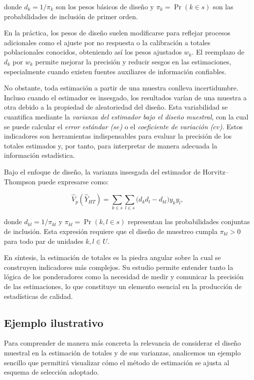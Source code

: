 \documentclass[
  spanish,
  12pt,
]{book}
\begin{document}
donde \(d_k = 1/\pi_k\) son los pesos básicos de diseño y \(\pi_k = \Pr(k \in s)\) son las probabilidades de inclusión de primer orden.

En la práctica, los pesos de diseño suelen modificarse para reflejar procesos adicionales como el ajuste por no respuesta o la calibración a totales poblacionales conocidos, obteniendo así los pesos ajustados \(w_k\). El reemplazo de \(d_k\) por \(w_k\) permite mejorar la precisión y reducir sesgos en las estimaciones, especialmente cuando existen fuentes auxiliares de información confiables.

No obstante, toda estimación a partir de una muestra conlleva incertidumbre. Incluso cuando el estimador es insesgado, los resultados varían de una muestra a otra debido a la propiedad de aleatoriedad del diseño. Esta variabilidad se cuantifica mediante la \emph{varianza del estimador bajo el diseño muestral}, con la cual se puede calcular el \emph{error estándar (\(se\))} o el \emph{coeficiente de variación (\(cv\))}. Estos indicadores son herramientas indispensables para evaluar la precisión de los totales estimados y, por tanto, para interpretar de manera adecuada la información estadística.

Bajo el enfoque de diseño, la varianza insesgada del estimador de Horvitz--Thompson puede expresarse como:

\[
\hat{V}_p(\hat{Y}_{HT}) = \sum_{k \in s} \sum_{l \in s} \bigl( d_k d_l - d_{kl} \bigr) y_k y_l,
\]

donde \(d_{kl} = 1/\pi_{kl}\) y \(\pi_{kl} = \Pr(k,l \in s)\) representan las probabilidades conjuntas de inclusión. Esta expresión requiere que el diseño de muestreo cumpla \(\pi_{kl} > 0\) para todo par de unidades \(k,l \in U\).

En síntesis, la estimación de totales es la piedra angular sobre la cual se construyen indicadores más complejos. Su estudio permite entender tanto la lógica de los ponderadores como la necesidad de medir y comunicar la precisión de las estimaciones, lo que constituye un elemento esencial en la producción de estadísticas de calidad.

\subsection{Ejemplo ilustrativo}\label{ejemplo-ilustrativo-1}

Para comprender de manera más concreta la relevancia de considerar el diseño muestral en la estimación de totales y de sus varianzas, analicemos un ejemplo sencillo que permitirá visualizar cómo el método de estimación se ajusta al esquema de selección adoptado.
\end{document}
